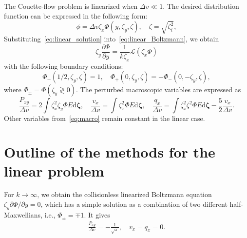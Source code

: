 \documentclass[review]{elsarticle}
\newcommand{\dd}{\mathrm{d}}
\newcommand{\pder}[2][]{\frac{\partial#1}{\partial#2}}
\newcommand{\Pder}[2][]{\partial#1/\partial#2}
\newcommand{\dzeta}{\boldsymbol{\dd\zeta}}
\begin{document}
The Couette-flow problem is linearized when \(\Delta{v}\ll 1\).
The desired distribution function can be expressed in the following form:
\begin{equation}\label{eq:linear_solution}
    \phi = \Delta{v} \zeta_x \Phi(y,\zeta_y,\zeta), \quad \zeta = \sqrt{\zeta_i^2},
\end{equation}
Substituting~\eqref{eq:linear_solution} into~\eqref{eq:linear_Boltzmann}, we obtain
\begin{equation}\label{eq:linear_equation}
    \zeta_y \pder[\Phi]{y} = \frac1{k\zeta_x}\mathcal{L}(\zeta_x\Phi)
\end{equation}
with the following boundary conditions:
\begin{equation}\label{eq:linear_bc}
    \Phi_-(1/2,\zeta_y,\zeta) = 1, \quad \Phi_+(0,\zeta_y,\zeta) = -\Phi_-(0,-\zeta_y,\zeta),
\end{equation}
where \(\Phi_\pm = \Phi(\zeta_y \gtrless 0)\).
The perturbed macroscopic variables are expressed as
\begin{equation}\label{eq:linear_macro}
    \frac{P_{xy}}{\Delta{v}} = 2\int \zeta_x^2 \zeta_y \Phi E\dzeta, \quad
    \frac{v_x}{\Delta{v}} = \int \zeta_x^2 \Phi E\dzeta, \quad
    \frac{q_x}{\Delta{v}} = \int \zeta_x^2 \zeta^2 \Phi E\dzeta - \frac52 \frac{v_x}{\Delta{v}}.
\end{equation}
Other variables from~\eqref{eq:macro} remain constant in the linear case.

\section{Outline of the methods for the linear problem}

For \(k\to\infty\), we obtain the collisionless linearized Boltzmann equation \(\zeta_y\Pder[\Phi]{y} = 0\),
which has a simple solution as a combination of two different half-Maxwellians, i.e., \(\Phi_\pm = \mp 1\).
It gives
\begin{gather}\label{eq:linear_free_macro}
    \frac{P_{xy}}{\Delta{v}} = -\frac1{\sqrt{\pi}}, \quad v_x = q_x = 0.
\end{gather}
\end{document}
